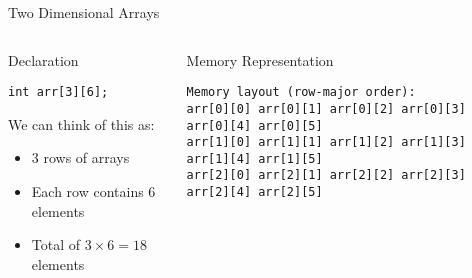 \documentclass{beamer}
\begin{document}
\begin{frame}{Two Dimensional Arrays}
    \begin{columns}
        \begin{column}{0.5\textwidth}
            \begin{block}{Declaration}
                \begin{lstlisting}
int arr[3][6];
                \end{lstlisting}
            \end{block}
            \vspace{0.5cm}
            We can think of this as:
            \begin{itemize}
                \item 3 rows of arrays
                \item Each row contains 6 elements
                \item Total of $3 \times 6 = 18$ elements
            \end{itemize}
        \end{column}
        \begin{column}{0.5\textwidth}
            \begin{block}{Memory Representation}
                \begin{lstlisting}[basicstyle=\ttfamily\footnotesize]
Memory layout (row-major order):
arr[0][0] arr[0][1] arr[0][2] arr[0][3] arr[0][4] arr[0][5]
arr[1][0] arr[1][1] arr[1][2] arr[1][3] arr[1][4] arr[1][5]
arr[2][0] arr[2][1] arr[2][2] arr[2][3] arr[2][4] arr[2][5]
                \end{lstlisting}
            \end{block}
        \end{column}
    \end{columns}
\end{frame}
\end{document}
